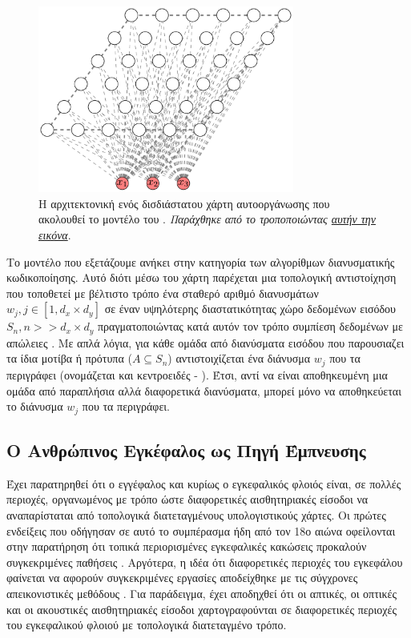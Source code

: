 \begin{figure}[h]
  \centering
  \includegraphics[width=0.75\textwidth]{images/chapter theoritical background/Self-organizing-map.pdf}
  \caption{Η αρχιτεκτονική ενός δισδιάστατου χάρτη αυτο\textendash οργάνωσης που ακολουθεί το μοντέλο του . \textit{Παράχθηκε από το \href{https://inkscape.org/}{} τροποποιώντας \href{https://commons.wikimedia.org/wiki/File:Self-organizing-map.svg}{αυτήν την εικόνα}}.}
  \label{fig:SOM}
\end{figure}

Το μοντέλο  που εξετάζουμε ανήκει στην κατηγορία των αλγορίθμων διανυσματικής κωδικοποίησης. Αυτό διότι μέσω του χάρτη  παρέχεται μια τοπολογική αντιστοίχηση που τοποθετεί με βέλτιστο τρόπο ένα σταθερό αριθμό διανυσμάτων $w_j, j \in [1, d_x \times d_y]$ σε έναν υψηλότερης διαστατικότητας χώρο δεδομένων εισόδου $S_n, n >> d_x \times d_y$ πραγματοποιώντας κατά αυτόν τον τρόπο συμπίεση δεδομένων με απώλειες \cite{haykin2009neural}. Με απλά λόγια, για κάθε ομάδα από διανύσματα εισόδου που παρουσιαζει τα ίδια μοτίβα ή πρότυπα ($A \subseteq S_n$) αντιστοιχίζεται ένα διάνυσμα $w_j$ που τα περιγράφει (ονομάζεται και κεντροειδές - ). Έτσι, αντί να είναι αποθηκευμένη μια ομάδα από παραπλήσια αλλά διαφορετικά διανύσματα, μπορεί μόνο να αποθηκεύεται το διάνυσμα $w_j$ που τα περιγράφει.

\subsection{Ο Ανθρώπινος Εγκέφαλος ως Πηγή Έμπνευσης}

Έχει παρατηρηθεί ότι ο εγγέφαλος και κυρίως ο εγκεφαλικός φλοιός είναι, σε πολλές περιοχές, οργανωμένος με τρόπο ώστε διαφορετικές αισθητηριακές είσοδοι να αναπαρίσταται από τοπολογικά διατεταγμένους υπολογιστικούς χάρτες\cite{haykin2009neural}. Οι πρώτες ενδείξεις που οδήγησαν σε αυτό το συμπέρασμα ήδη από τον 18ο αιώνα \cite{finger2000minds} οφείλονται στην παρατήρηση ότι τοπικά περιορισμένες εγκεφαλικές κακώσεις προκαλούν συγκεκριμένες παθήσεις \cite{kohonen1990self, eickhoff2018topographic}. Αργότερα, η ιδέα ότι διαφορετικές περιοχές του εγκεφάλου φαίνεται να αφορούν συγκεκριμένες εργασίες αποδείχθηκε με τις σύγχρονες απεικονιστικές μεθόδους \cite{kohonen1990self}. Για παράδειγμα, έχει αποδηχθεί ότι οι απτικές, οι οπτικές και οι ακουστικές αισθητηριακές είσοδοι χαρτογραφούνται  σε διαφορετικές περιοχές του εγκεφαλικού φλοιού με τοπολογικά διατεταγμένο τρόπο\cite{haykin2009neural}.\par

